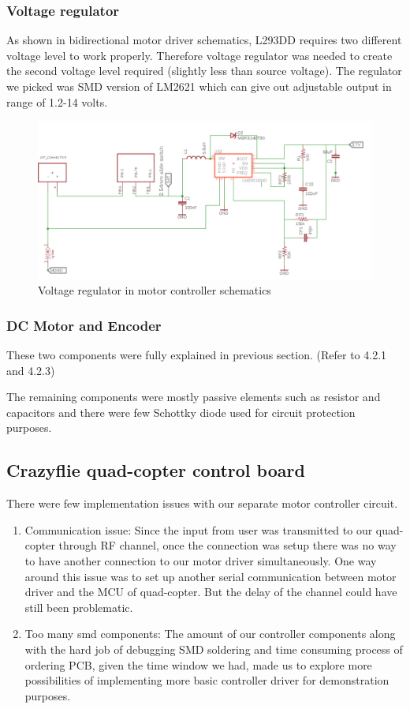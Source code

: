 \subsubsection{Voltage regulator}
As shown in bidirectional motor driver schematics, L293DD requires two different voltage level to work properly. Therefore voltage regulator was needed to create the second voltage level required (slightly less than source voltage). The regulator we picked was SMD version of LM2621 which can give out adjustable output in range of 1.2-14 volts. 
 \begin{figure}[H]
\centering
\includegraphics[width=1\textwidth]{./Amir_img/voltageReg.png}
\caption{Voltage regulator in motor controller schematics }
\end{figure} 
\subsubsection{DC Motor and Encoder}
These two components were fully explained in previous section. (Refer to 4.2.1 and 4.2.3)

The remaining components were mostly passive elements such as resistor and capacitors and there were few Schottky diode used for circuit protection purposes. 
\subsection{Crazyflie quad-copter control board}
There were few implementation issues with our separate motor controller circuit. 
\begin{enumerate}
\item Communication issue:
Since the input from user was transmitted to our quad-copter through RF channel, once the connection was setup there was no way to have another connection to our motor driver simultaneously. One way around this issue was to set up another serial communication between motor driver and the MCU of quad-copter. But the delay of the channel could have still been problematic.
\item Too many smd components:
The amount of our controller components along with the hard job of debugging SMD soldering and time consuming process of ordering PCB, given the time window we had, made us to explore more possibilities of implementing more basic controller driver for demonstration purposes.
\end {enumerate}

